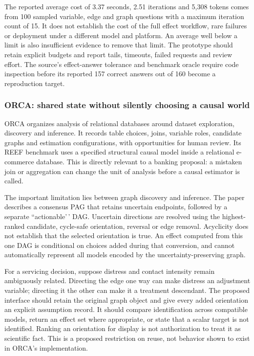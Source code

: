The reported average cost of 3.37 seconds, 2.51 iterations and 5,308
tokens comes from 100 sampled variable, edge and graph questions with a
maximum iteration count of 15. It does not establish the cost of the
full effect workflow, rare failures or deployment under a different
model and platform. An average well below a limit is also insufficient
evidence to remove that limit. The prototype should retain explicit
budgets and report tails, timeouts, failed requests and review effort.
The source's effect-answer tolerance and benchmark oracle require code
inspection before its reported 157 correct answers out of 160 become a
reproduction target. \citep{exec13_census_causal_agent}

\hypertarget{orca-shared-state-without-silently-choosing-a-causal-world}{%
\subsubsection{ORCA: shared state without silently choosing a causal
world}\label{orca-shared-state-without-silently-choosing-a-causal-world}}

ORCA organizes analysis of relational databases around dataset
exploration, discovery and inference. It records table choices, joins,
variable roles, candidate graphs and estimation configurations, with
opportunities for human review. Its REEF benchmark uses a specified
structural causal model inside a relational e-commerce database. This is
directly relevant to a banking proposal: a mistaken join or aggregation
can change the unit of analysis before a causal estimator is called.
\citep{exec13_census_orca}

The important limitation lies between graph discovery and inference. The
paper describes a consensus PAG that retains uncertain endpoints,
followed by a separate ``actionable'\,' DAG. Uncertain directions are
resolved using the highest-ranked candidate, cycle-safe orientation,
reversal or edge removal. Acyclicity does not establish that the
selected orientation is true. An effect computed from this one DAG is
conditional on choices added during that conversion, and cannot
automatically represent all models encoded by the uncertainty-preserving
graph.

For a servicing decision, suppose distress and contact intensity remain
ambiguously related. Directing the edge one way can make distress an
adjustment variable; directing it the other can make it a treatment
descendant. The proposed interface should retain the original graph
object and give every added orientation an explicit assumption record.
It should compare identification across compatible models, return an
effect set where appropriate, or state that a scalar target is not
identified. Ranking an orientation for display is not authorization to
treat it as scientific fact. This is a proposed restriction on reuse,
not behavior shown to exist in ORCA's implementation.

